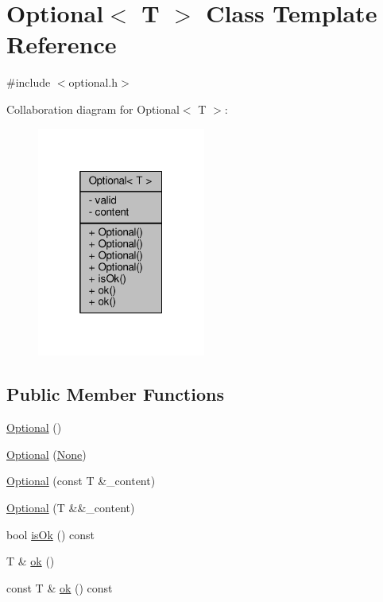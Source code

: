 \hypertarget{classOptional}{}\section{Optional$<$ T $>$ Class Template Reference}
\label{classOptional}


{\ttfamily \#include $<$optional.\+h$>$}



Collaboration diagram for Optional$<$ T $>$\+:\nopagebreak
\begin{figure}[H]
\begin{center}
\leavevmode
\includegraphics[width=157pt]{classOptional__coll__graph}
\end{center}
\end{figure}
\subsection*{Public Member Functions}
\begin{DoxyCompactItemize}
\item 
\hyperlink{classOptional_a7e936c9ca1669872d5e69ee5b2638088}{Optional} ()
\item 
\hyperlink{classOptional_a3b83f585aaa6a83591a3e32fe70c1087}{Optional} (\hyperlink{classNone}{None})
\item 
\hyperlink{classOptional_a78c5b279afd6400594f25961b927b2db}{Optional} (const T \&\+\_\+content)
\item 
\hyperlink{classOptional_a167b270716a2fed9d345625df0784700}{Optional} (T \&\&\+\_\+content)
\item 
bool \hyperlink{classOptional_a57a690d23369434ecc65d64e8a710b92}{is\+Ok} () const 
\item 
T \& \hyperlink{classOptional_a6527daf92b89333557d6b37938a965f2}{ok} ()
\item 
const T \& \hyperlink{classOptional_a1d5c2fc9361cd4944f8efda048003190}{ok} () const 
\end{DoxyCompactItemize}
